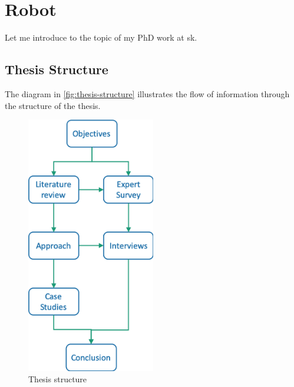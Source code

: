 \chapter{Robot}

Let me introduce to the topic of my PhD work at \acrfull{sk}.


\section{Thesis Structure}
The diagram in \autoref{fig:thesis-structure} illustrates the flow of information through the structure of the thesis.

\begin{figure}[htb!]
\centering \includegraphics[width=0.5\textwidth]{graphics/thesis-structure}
\caption{Thesis structure}
\label{fig:thesis-structure}
\end{figure}


